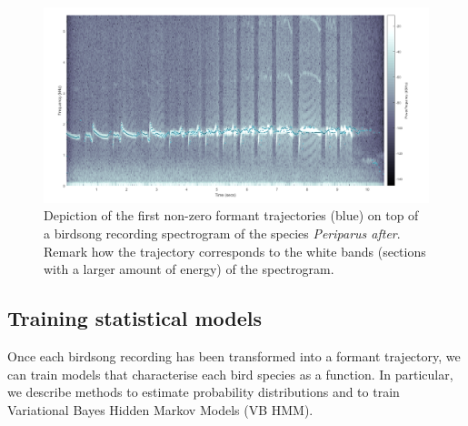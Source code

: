 \documentclass[pdftex,11pt,a4paper]{article}
\theoremstyle{definition}
\theoremstyle{remark}
\begin{document}
\begin{figure}[t]
\centering
\includegraphics[width=\textwidth]{images/formants}
\caption{Depiction of the first non-zero formant trajectories (blue) on top of a birdsong recording spectrogram of the species \emph{Periparus after}. Remark how the trajectory corresponds to the white bands (sections with a larger amount of energy) of the spectrogram.}
\label{fig_specformants}
\end{figure}

\subsection{Training statistical models}
Once each birdsong recording has been transformed into a formant trajectory, we can train models that characterise each bird species as a function. In particular, we describe methods to estimate probability distributions and to train Variational Bayes Hidden Markov Models (VB HMM).
\end{document}
